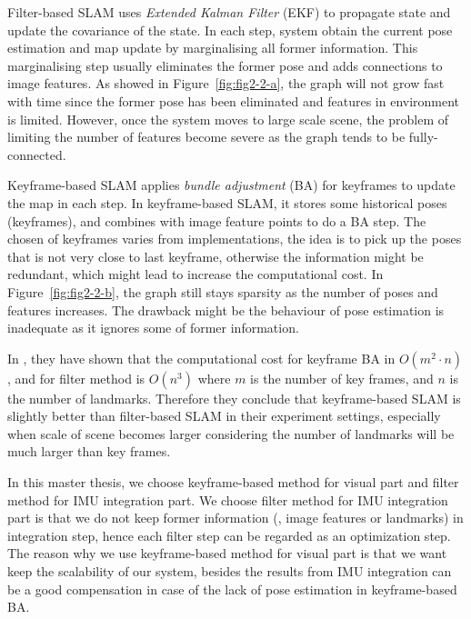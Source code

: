 Filter-based SLAM \cite{davison2007monoslam, eade2007monocular, davison2003real} uses \textit{Extended Kalman Filter} (EKF) to propagate state and update the covariance of the state. In each step, system obtain the current pose estimation and map update by marginalising all former information. This marginalising step usually eliminates the former pose and adds connections to image features. As showed in Figure~\ref{fig:fig2-2-a}, the graph will not grow fast with time since the former pose has been eliminated and features in environment is limited. However, once the system moves to large scale scene, the problem of limiting the number of features become severe as the graph tends to be fully-connected. 
   
Keyframe-based SLAM \cite{klein2007parallel, mourikis2007multi, forster2014svo, engel2014lsd, mur2015orb} applies \textit{bundle adjustment} (BA) for keyframes to update the map in each step. In keyframe-based SLAM, it stores some historical poses (keyframes), and combines with image feature points to do a BA step. The chosen of keyframes varies from implementations, the idea is to pick up the poses that is not very close to last keyframe, otherwise the information might be redundant, which might lead to increase the computational cost. In Figure~\ref{fig:fig2-2-b}, the graph still stays sparsity as the number of poses and features increases. The drawback might be the behaviour of pose estimation is inadequate as it ignores some of former information.

In \cite{strasdat2010real}, they have shown that the computational cost for keyframe BA in $O(m^2 \cdot n)$, and for filter method is $O(n^3)$ where $m$ is the number of key frames, and $n$ is the number of landmarks. Therefore they conclude that keyframe-based SLAM is slightly better than filter-based SLAM in their experiment settings, especially when scale of scene becomes larger considering the number of landmarks will be much larger than key frames.

In this master thesis, we choose keyframe-based method for visual part and filter method for IMU integration part. We choose filter method for IMU integration part is that we do not keep former information (\eg, image features or landmarks) in integration step, hence each filter step can be regarded as an optimization step. The reason why we use keyframe-based method for visual part is that we want keep the scalability of our system, besides the results from IMU integration can be a good compensation in case of the lack of pose estimation in keyframe-based BA.

